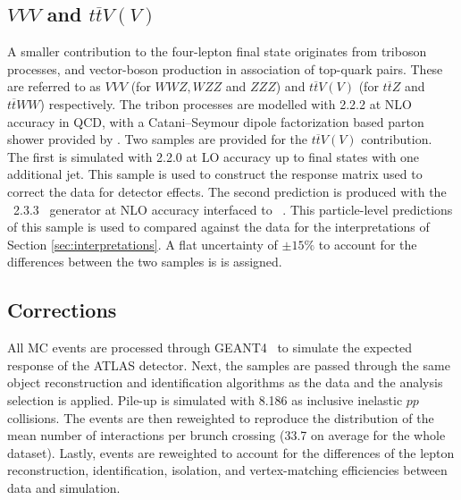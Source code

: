 \subsection{$VVV$ and $t\overline{t}V(V)$}
A smaller contribution to the four-lepton final state originates from triboson processes, and vector-boson production in association of top-quark pairs. These are referred to as $VVV$ (for $WWZ, WZZ$ and $ZZZ$) and $t\overline{t}V(V)$ (for $t\overline{t}Z$ and $t\overline{t}WW$) respectively. The tribon processes are modelled with \SHERPA{} 2.2.2 at NLO accuracy in QCD, with a Catani–Seymour dipole factorization based parton shower provided by \SHERPA{}. Two samples are provided for the  $t\overline{t}V(V)$ contribution. The first is simulated with \SHERPA{} 2.2.0 at LO accuracy up to final states with one additional jet. This sample is used to construct the response matrix used to correct the data for detector effects. The second prediction is produced with the \madgraph~2.3.3~\cite{Alwall:2014hca} generator at NLO accuracy interfaced to ~\cite{Sjostrand:2014zea}. This particle-level predictions of this sample is used to compared against the data for the interpretations of Section \ref{sec:interpretations}. A flat uncertainty of $\pm15\%$ to account for the differences between the two samples is is assigned.

\subsection{Corrections}
All MC events are processed through GEANT4~\cite{Geant4} to simulate the expected response of the ATLAS detector. Next, the samples are passed through the same object reconstruction and identification algorithms as the data and the analysis selection is applied. Pile-up is simulated with \pythia{} 8.186 as inclusive inelastic $pp$ collisions. The events are then reweighted to reproduce the distribution of the mean number of interactions per brunch crossing (33.7 on average for the whole dataset). Lastly, events are  reweighted to account for the differences of the lepton reconstruction, identification, isolation, and vertex-matching efficiencies between data and simulation.


